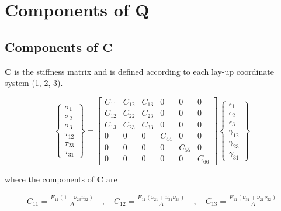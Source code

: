 \section{Components of \texorpdfstring{$\boldsymbol{Q}$}{}} \label{app:stiff_mat}
\subsection{Components of \texorpdfstring{$\boldsymbol{C}$}{}}
$\bm{C}$ is the stiffness matrix and is defined according to each lay-up coordinate system (1, 2, 3). 

\begin{equation}
\begin{Bmatrix}
\sigma_1\\ 
\sigma_2\\ 
\sigma_3\\ 
\tau_{12}\\ 
\tau_{23}\\ 
\tau_{31}
\end{Bmatrix}
=\begin{bmatrix}
C_{11} & C_{12} & C_{13} & 0 & 0 & 0 \\ 
C_{12} & C_{22} & C_{23} & 0 & 0 & 0 \\ 
C_{13} & C_{23} & C_{33} & 0 & 0 & 0 \\ 
0 & 0 & 0 & C_{44} & 0 & 0 \\ 
0 & 0 & 0 & 0 & C_{55} & 0 \\ 
0 & 0 & 0 & 0 & 0 & C_{66}
\end{bmatrix}
\begin{Bmatrix}
\epsilon_1\\ 
\epsilon_2\\ 
\epsilon_3\\ 
\gamma_{12}\\ 
\gamma_{23}\\ 
\gamma_{31}
\end{Bmatrix}
\label{eq:C_mat}
\end{equation}

where the components of $\bm{C}$ are

\begin{equation*}
\begin{matrix}
    C_{11} = \displaystyle\frac{E_{11} (1 - \nu_{23} \nu_{32})}{\Delta} \quad, \quad
    C_{12} = \displaystyle\frac{E_{11} (\nu_{21} + \nu_{31} \nu_{23})}{\Delta} \quad, \quad
    C_{13} = \displaystyle\frac{E_{11} (\nu_{31} + \nu_{21} \nu_{32})}{\Delta}
\end{matrix}
\end{equation*}


